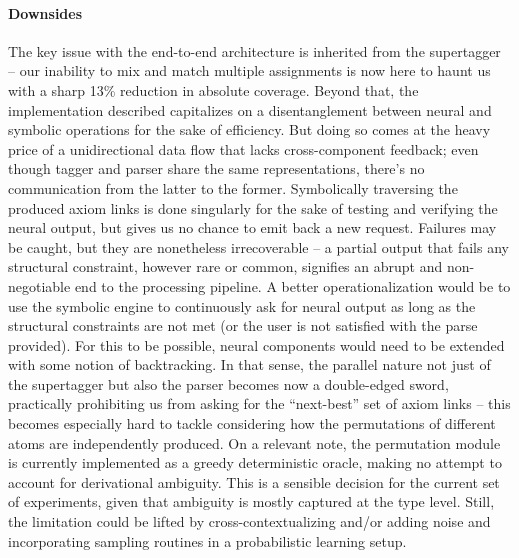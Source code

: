 \paragraph{Downsides}
The key issue with the end-to-end architecture is inherited from the supertagger -- our inability to mix and match multiple assignments is now here to haunt us with a sharp 13\% reduction in absolute coverage.
Beyond that, the implementation described capitalizes on a disentanglement between neural and symbolic operations for the sake of efficiency.
But doing so comes at the heavy price of a unidirectional data flow that lacks cross-component feedback; even though tagger and parser share the same representations, there's no communication from the latter to the former.
Symbolically traversing the produced axiom links is done singularly for the sake of testing and verifying the neural output, but gives us no chance to emit back a new request.
Failures may be caught, but they are nonetheless irrecoverable -- a partial output that fails any structural constraint, however rare or common, signifies an abrupt and non-negotiable end to the processing pipeline.
A better operationalization would be to use the symbolic engine to continuously ask for neural output as long as the structural constraints are not met (or the user is not satisfied with the parse provided).
For this to be possible, neural components would need to be extended with some notion of backtracking.
In that sense, the parallel nature not just of the supertagger but also the parser becomes now a double-edged sword, practically prohibiting us from asking for the ``next-best'' set of axiom links -- this becomes especially hard to tackle considering how the permutations of different atoms are independently produced.
On a relevant note, the permutation module is currently implemented as a greedy deterministic oracle, making no attempt to account for derivational ambiguity. 
This is a sensible decision for the current set of experiments, given that ambiguity is mostly captured at the type level.
Still, the limitation could be lifted by cross-contextualizing and/or adding noise and incorporating sampling routines in a probabilistic learning setup.

